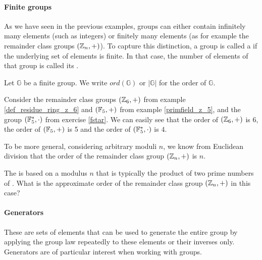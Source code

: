 \paragraph{Finite groups} As we have seen in the previous examples, groups can either contain infinitely many elements (such as integers) or finitely many elements (as for example the remainder class groups $(\mathbb{Z}_n,+)$). To capture this distinction, a group is called a  if the underlying set of elements is finite. In that case, the number of elements of that group is called its .
\begin{notation}
Let $\mathbb{G}$ be a finite group. We write $ord(\mathbb{G})$ or  $|\mathbb{G}|$ for the order of $\mathbb{G}$.
\end{notation}
\begin{example}\label{Zn}
Consider the remainder class groups $(\mathbb{Z}_6,+)$ from example \ref{def_residue_ring_z_6} and $(\mathbb{F}_5,+)$  from example \ref{primfield_z_5}, and the group $(\mathbb{F}_5^*,\cdot)$ from exercise \ref{fstar}. We can easily see that the order of $(\mathbb{Z}_6,+)$ is $6$, the order of $(\mathbb{F}_5,+)$ is 5 and the order of $(\mathbb{F}_5^*,\cdot)$ is $4$.

To be more general, considering arbitrary moduli $n$, we know from Euclidean division that the order of the remainder class group $(\mathbb{Z}_n,+)$ is $n$.
\end{example}
\begin{exercise}The  is based on a modulus $n$ that is typically the product of two prime numbers of . What is the approximate order of the remainder class group $(\mathbb{Z}_n,+)$ in this case?
\end{exercise}
\paragraph{Generators}\label{generators} These are sets of elements that can be used to generate the entire group by applying the group law repeatedly to these elements or their inverses only. Generators are of particular interest when working with groups.


